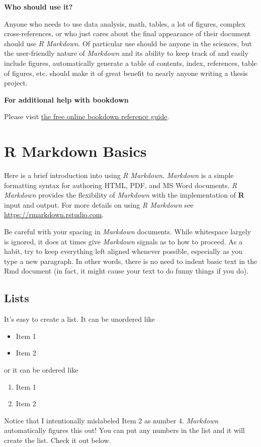 \documentclass[12pt,twoside]{reedthesis}
\providecommand{\tightlist}{%
  \setlength{\itemsep}{0pt}\setlength{\parskip}{0pt}}
\begin{document}
\textbf{Who should use it?}

Anyone who needs to use data analysis, math, tables, a lot of figures, complex cross-references, or who just cares about the final appearance of their document should use \emph{R Markdown}. Of particular use should be anyone in the sciences, but the user-friendly nature of \emph{Markdown} and its ability to keep track of and easily include figures, automatically generate a table of contents, index, references, table of figures, etc. should make it of great benefit to nearly anyone writing a thesis project.

\textbf{For additional help with bookdown}

Please visit \href{https://bookdown.org/yihui/bookdown/}{the free online bookdown reference guide}.

\hypertarget{rmd-basics}{%
\chapter{R Markdown Basics}\label{rmd-basics}}

Here is a brief introduction into using \emph{R Markdown}. \emph{Markdown} is a simple formatting syntax for authoring HTML, PDF, and MS Word documents. \emph{R Markdown} provides the flexibility of \emph{Markdown} with the implementation of \textbf{R} input and output. For more details on using \emph{R Markdown} see \url{https://rmarkdown.rstudio.com}.

Be careful with your spacing in \emph{Markdown} documents. While whitespace largely is ignored, it does at times give \emph{Markdown} signals as to how to proceed. As a habit, try to keep everything left aligned whenever possible, especially as you type a new paragraph. In other words, there is no need to indent basic text in the Rmd document (in fact, it might cause your text to do funny things if you do).

\hypertarget{lists}{%
\section{Lists}\label{lists}}

It's easy to create a list. It can be unordered like
\begin{itemize}
\tightlist
\item
  Item 1
\item
  Item 2
\end{itemize}
or it can be ordered like
\begin{enumerate}
\def\labelenumi{\arabic{enumi}.}
\tightlist
\item
  Item 1
\item
  Item 2
\end{enumerate}
Notice that I intentionally mislabeled Item 2 as number 4. \emph{Markdown} automatically figures this out! You can put any numbers in the list and it will create the list. Check it out below.
\end{document}
